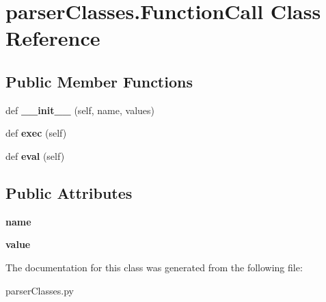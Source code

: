 \hypertarget{classparser_classes_1_1_function_call}{}\section{parser\+Classes.\+Function\+Call Class Reference}
\label{classparser_classes_1_1_function_call}
\subsection*{Public Member Functions}
\begin{DoxyCompactItemize}
\item 
def {\bfseries \+\_\+\+\_\+init\+\_\+\+\_\+} (self, name, values)\hypertarget{classparser_classes_1_1_function_call_ad930b950c34a88b26cef52f5618156d4}{}\label{classparser_classes_1_1_function_call_ad930b950c34a88b26cef52f5618156d4}

\item 
def {\bfseries exec} (self)\hypertarget{classparser_classes_1_1_function_call_aea0238c65245e0bcf62a6e23ce872c8a}{}\label{classparser_classes_1_1_function_call_aea0238c65245e0bcf62a6e23ce872c8a}

\item 
def {\bfseries eval} (self)\hypertarget{classparser_classes_1_1_function_call_af81e89a97941ea33f06b0790ce7a14ef}{}\label{classparser_classes_1_1_function_call_af81e89a97941ea33f06b0790ce7a14ef}

\end{DoxyCompactItemize}
\subsection*{Public Attributes}
\begin{DoxyCompactItemize}
\item 
{\bfseries name}\hypertarget{classparser_classes_1_1_function_call_ae6849adc02987ed0a6309f1adc62b07c}{}\label{classparser_classes_1_1_function_call_ae6849adc02987ed0a6309f1adc62b07c}

\item 
{\bfseries value}\hypertarget{classparser_classes_1_1_function_call_a76fb558f6ce115596d568c321ae4b28d}{}\label{classparser_classes_1_1_function_call_a76fb558f6ce115596d568c321ae4b28d}

\end{DoxyCompactItemize}


The documentation for this class was generated from the following file\+:\begin{DoxyCompactItemize}
\item 
parser\+Classes.\+py\end{DoxyCompactItemize}
